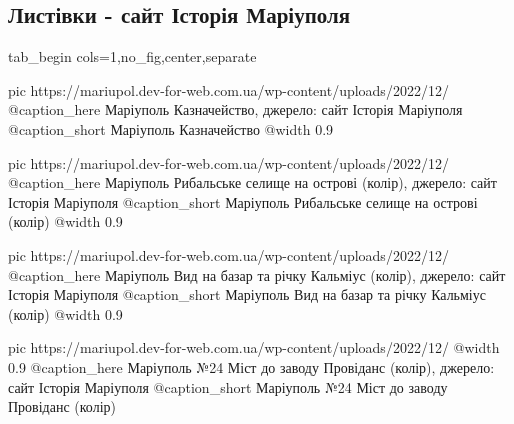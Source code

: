  
 
 
 
 

\subsection{Листівки - сайт Історія Маріуполя}

\ifcmt
  tab_begin cols=1,no_fig,center,separate

  pic https://mariupol.dev-for-web.com.ua/wp-content/uploads/2022/12/%
  @caption_here Маріуполь Казначейство, джерело: сайт Історія Маріуполя
  @caption_short Маріуполь Казначейство
  @width 0.9

	pic https://mariupol.dev-for-web.com.ua/wp-content/uploads/2022/12/%
	@caption_here Маріуполь Рибальське селище на острові (колір), джерело: сайт Історія Маріуполя
	@caption_short Маріуполь Рибальське селище на острові (колір)
	@width 0.9

	pic https://mariupol.dev-for-web.com.ua/wp-content/uploads/2022/12/%
	@caption_here Маріуполь Вид на базар та річку Кальміус (колір), джерело: сайт Історія Маріуполя
	@caption_short Маріуполь Вид на базар та річку Кальміус (колір)
	@width 0.9

	pic https://mariupol.dev-for-web.com.ua/wp-content/uploads/2022/12/%
	@width 0.9
	@caption_here Маріуполь №24 Міст до заводу Провіданс (колір), джерело: сайт Історія Маріуполя
	@caption_short Маріуполь №24 Міст до заводу Провіданс (колір)

